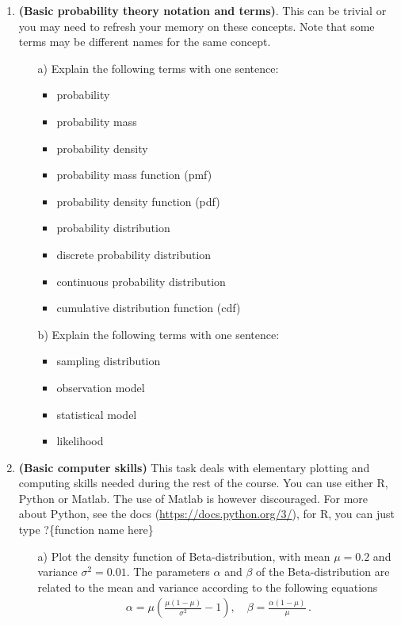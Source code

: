 \documentclass[11pt,a4paper,english]{article}
\begin{document}
\begin{enumerate}

\item {\bf (Basic probability theory notation and terms)}. This can be trivial or you may need to refresh your memory on these concepts. Note that some terms may be different names for the same concept.
  \begin{itemize}
  \item[a)] Explain the following terms with one sentence:
    \begin{itemize}
    \item probability
    \item probability mass
    \item probability density
    \item probability mass function (pmf)
    \item probability density function (pdf)
    \item probability distribution
    \item discrete probability distribution
    \item continuous probability distribution
    \item cumulative distribution function (cdf)
    \end{itemize}
  \item[b)] Explain the following terms with one sentence:
    \begin{itemize}
    \item sampling distribution
    \item observation model
    \item statistical model
    \item likelihood
    \end{itemize}
  \end{itemize}

\item {\bf (Basic computer skills)} This task deals with elementary plotting and computing skills needed during the rest of the course. You can use either R, Python or Matlab. The use of Matlab is however discouraged.
For more about Python, see the docs (\href{https://docs.python.org/3/}{https://docs.python.org/3/}), for R, you can just type ?\{function name here\}
\begin{itemize}
	\item[a)] Plot the density function of Beta-distribution, with mean $\mu = 0.2$ and variance $\sigma^2=0.01$. The parameters $\alpha$ and $\beta$ of the Beta-distribution are related to the mean and variance according to the following equations
	\begin{align*}
	\alpha = \mu \left( \frac{\mu(1-\mu)}{\sigma^2} - 1 \right), \quad
	\beta = \frac{\alpha (1-\mu) }{\mu} \,.
\end{align*}


\end{itemize}
\end{enumerate}
\end{document}
